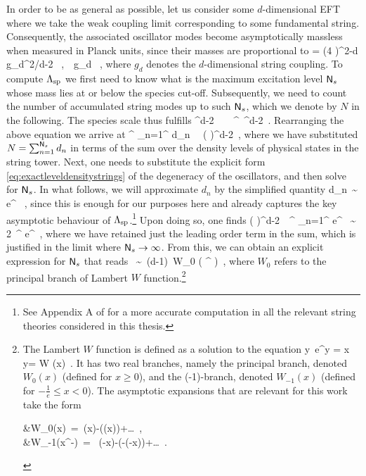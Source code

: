 In order to be as general as possible, let us consider some $d$-dimensional EFT where we take the weak coupling limit corresponding to some fundamental string. Consequently, the associated oscillator modes become asymptotically massless when measured in Planck units, since their masses are proportional to 
%
\beq\label{eq:ddimdilaton}
	 = (4 \pi)^{2-d}\, g_d^{2/d-2} \, ,\qquad {}\ \ g_d \, ,
\eeq
%
where $g_d$ denotes the $d$-dimensional string coupling. To compute $\Lambda_{\text{sp}}$ we first need to know what is the maximum excitation level $\mathsf{N}_s$ whose mass lies at or below the species cut-off. Subsequently, we need to count the number of accumulated string modes up to such $\mathsf{N}_s$, which we denote by $N$ in the following. The species scale thus fulfills
%
\beq
\label{eq:speciescale}
	\LSP^{d-2}\, \simeq\, \, \simeq\, \Ns^{}\, \Ms^{d-2}\, .
\eeq
%
Rearranging the above equation we arrive at
%
\beq
\label{eq:Ns}
	\Ns^{} \sum_{n=1}^{\Ns} d_n \, \simeq\, \left ( \frac{\Mpd}{\Ms}\right )^{d-2}\, ,
\eeq
%
where we have substituted $N =\sum_{n=1}^{\mathsf{N}_s} d_n$ in terms of the sum over the density levels of physical states in the string tower. Next, one needs to substitute the explicit form \eqref{eq:exactleveldensitystrings} of the degeneracy of the oscillators, and then solve for $\mathsf{N}_s$. In what follows, we will approximate $d_n$ by the simplified quantity
%
\beq
	d_n\, \sim\, e^{ }\, ,
	\label{eq:leveldensity}
\eeq
%
since this is enough for our purposes here and already captures the key asymptotic behaviour of $\Lambda_{\text{sp}}$.\footnote{See Appendix A of \cite{Castellano:2022bvr} for a more accurate computation in all the relevant string theories considered in this thesis.} Upon doing so, one finds 
%
\beq
	\left ( \dfrac{ \Mpd}{\Ms}\right )^{d-2}\, \simeq\, \Ns^{} \sum_{n=1}^{\Ns} e^{} \, \sim\, 2\, \Ns^{} e^{\sqrt{\Ns}}\, ,
\label{eq:maxstringlevel}
\eeq
%
where we have retained just the leading order term in the sum, which is justified in the limit where $\mathsf{N}_s \to \infty$. From this, we can obtain an explicit expression for $\mathsf{N}_s$ that reads
%
\beq
	\sqrt{\Ns}\, \sim\, (d-1)\, W_0 \left(  \left[ \dfrac{\Mpd}{\Ms} \right]^{} \right)\, ,
\eeq
%
where $W_0$ refers to the principal branch of Lambert $W$ function.\footnote{\label{fn:Lambert} The Lambert $W$ function is defined as a solution to the equation
%
\beq
	\notag y\ e^y = x \iff y= W (x)\, .
\eeq
%
It has two real branches, namely  the principal branch, denoted  $W_0 (x)$ (defined for $x\geq 0$),  and the (-1)-branch, denoted $W_{-1}(x)$ (defined for $ -\frac{1}{e} \leq x < 0$). The asymptotic expansions that are relevant for this work take the form \cite{Lambert}
%
\beq
\label{eq:Wexpansion}
		\begin{split}
			&W_{0}(x\to \infty)\, =\, \log (x)-\log (\log(x))+\ldots\, ,\\
			&W_{-1}(x^-)\, = \, \log (-x)-\log (-\log(-x))+\ldots\, .
		\end{split}
\eeq
%
}
